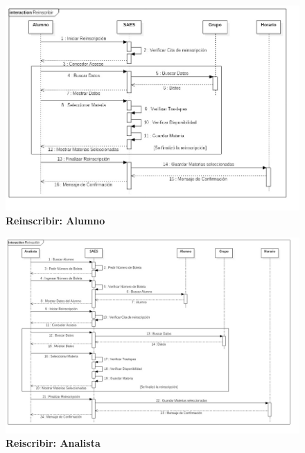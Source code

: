 \begin{figure}[H]
  \centering
    \includegraphics[scale=0.7, angle=90]{project/Secuencia/Reinscribir.jpg}
  \caption{\textbf{Reinscribir: Alumno}}
\end{figure}
\newpage
\begin{figure}[H]
  \centering
    \includegraphics[scale=0.5,angle=90]{project/Secuencia/ReinscribirAn.jpg}
  \caption{\textbf{Reiscribir: Analista}}
\end{figure}

